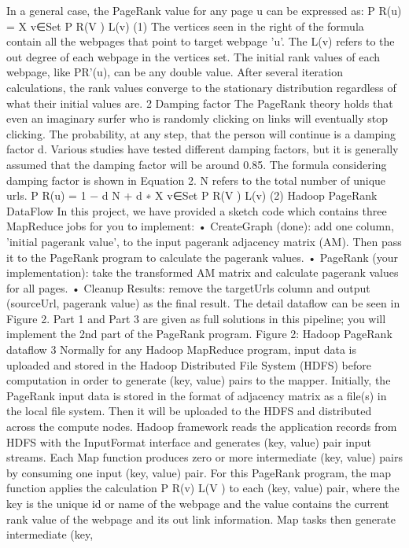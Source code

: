 In a general case, the PageRank value for any page u can be expressed as:
P R(u) = X
v∈Set
P R(V )
L(v)
(1)
The vertices seen in the right of the formula contain all the webpages that point to target webpage ’u’.
The L(v) refers to the out degree of each webpage in the vertices set. The initial rank values of each webpage,
like PR’(u), can be any double value. After several iteration calculations, the rank values converge to the
stationary distribution regardless of what their initial values are.
2
Damping factor
The PageRank theory holds that even an imaginary surfer who is randomly clicking on links will eventually
stop clicking. The probability, at any step, that the person will continue is a damping factor d. Various
studies have tested different damping factors, but it is generally assumed that the damping factor will be
around 0.85. The formula considering damping factor is shown in Equation 2. N refers to the total number
of unique urls.
P R(u) = 1 − d
N
+ d ∗
X
v∈Set
P R(V )
L(v)
(2)
Hadoop PageRank DataFlow
In this project, we have provided a sketch code which contains three MapReduce jobs for you to implement:
• CreateGraph (done): add one column, ’initial pagerank value’, to the input pagerank adjacency matrix
(AM). Then pass it to the PageRank program to calculate the pagerank values.
• PageRank (your implementation): take the transformed AM matrix and calculate pagerank values for
all pages.
• Cleanup Results: remove the targetUrls column and output (sourceUrl, pagerank value) as the
final result.
The detail dataflow can be seen in Figure 2. Part 1 and Part 3 are given as full solutions in this pipeline;
you will implement the 2nd part of the PageRank program.
Figure 2: Hadoop PageRank dataflow
3
Normally for any Hadoop MapReduce program, input data is uploaded and stored in the Hadoop Distributed
File System (HDFS) before computation in order to generate (key, value) pairs to the mapper.
Initially, the PageRank input data is stored in the format of adjacency matrix as a file(s) in the local file
system. Then it will be uploaded to the HDFS and distributed across the compute nodes. Hadoop framework
reads the application records from HDFS with the InputFormat interface and generates (key, value) pair
input streams. Each Map function produces zero or more intermediate (key, value) pairs by consuming
one input (key, value) pair. For this PageRank program, the map function applies the calculation P R(v)
L(V )
to
each (key, value) pair, where the key is the unique id or name of the webpage and the value contains the
current rank value of the webpage and its out link information. Map tasks then generate intermediate (key,

